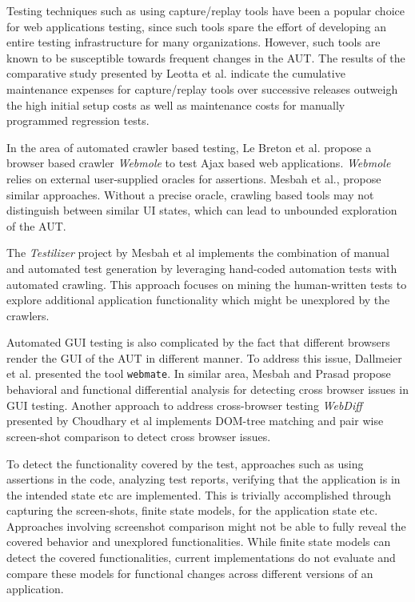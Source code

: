Testing techniques such as using capture/replay tools have been a popular choice for web applications testing, since such tools spare the effort of developing an entire testing infrastructure for many organizations. However, such tools are known to be susceptible towards frequent changes in the AUT\cite{sjosten2006costs}. The results of the comparative study presented by Leotta et al.\cite{leotta2013capture} indicate the cumulative maintenance expenses for capture/replay tools over successive releases outweigh the high initial setup costs as well as maintenance costs for manually programmed regression tests. 

In the area of automated crawler based testing, Le Breton et al. \cite{le2013automated} propose a browser based crawler \textit{Webmole} to test Ajax based web applications. \textit{Webmole} relies on external user-supplied oracles for assertions. Mesbah et al.\cite{Crawljax},\cite{MesbahInvarient} propose similar approaches. Without a precise oracle, crawling based tools may not distinguish between similar UI states, which can lead to unbounded exploration of the AUT.

The \textit{Testilizer} project by Mesbah et al\cite{testilizer} implements the combination of manual and automated test generation by leveraging hand-coded automation tests with automated crawling. This approach focuses on mining the human-written tests to explore additional application functionality which might be unexplored by the crawlers. 

Automated GUI testing is also complicated by the fact that different browsers render the GUI of the AUT in different manner. To address this issue, Dallmeier et al. presented the tool \texttt{webmate}. In similar area, Mesbah and Prasad\cite{CBCMesbah} propose behavioral and functional differential analysis for detecting cross browser issues in GUI testing. Another approach to address cross-browser testing \textit{WebDiff} presented by Choudhary et al \cite{WebDiff} implements DOM-tree matching and pair wise screen-shot comparison to detect cross browser issues. 

To detect the functionality covered by the test, approaches such as using assertions\cite{voas1997assertions} in the code, analyzing test reports, verifying that the application is in the intended state etc are implemented. This is trivially accomplished through capturing the screen-shots\cite{GUIdiffBauersfeld}, finite state models\cite{marchettoStateBased},\cite{SchurMiningBehavModels} for the application state etc. Approaches involving screenshot comparison might not be able to fully reveal the covered behavior and unexplored functionalities. While finite state models can detect the covered functionalities, current implementations do not evaluate and compare these models for functional changes across different versions of an application. 


